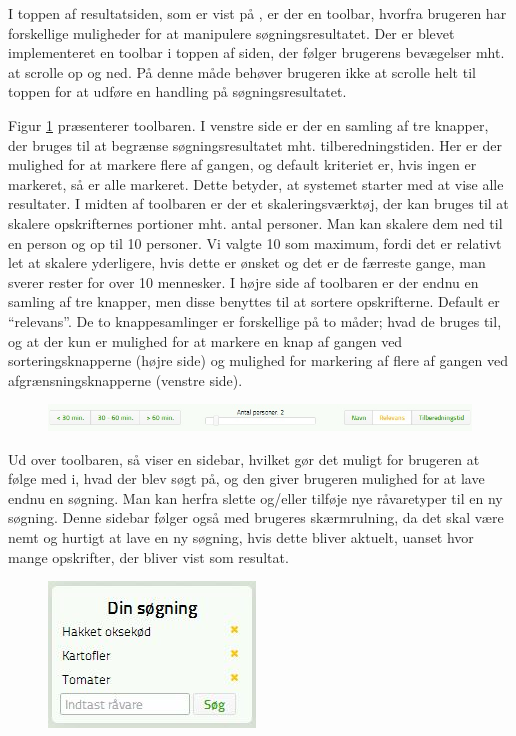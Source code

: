 I toppen af resultatsiden, som er vist på , er der en toolbar, hvorfra brugeren har forskellige muligheder for at manipulere søgningsresultatet. Der er blevet implementeret en toolbar i toppen af siden, der følger brugerens bevægelser mht. at scrolle op og ned. På denne måde behøver brugeren ikke at scrolle helt til toppen for at udføre en handling på søgningsresultatet. 

Figur \ref{fig:foodl-toolbar} præsenterer toolbaren. I venstre side er der en samling af tre knapper, der bruges til at begrænse søgningsresultatet mht. tilberedningstiden. Her er der mulighed for at markere flere af gangen, og default kriteriet er, hvis ingen er markeret, så er alle markeret. Dette betyder, at systemet starter med at vise alle resultater. 
I midten af toolbaren er der et skaleringsværktøj, der kan bruges til at skalere opskrifternes portioner mht. antal personer. Man kan skalere dem ned til en person og op til 10 personer. Vi valgte 10 som maximum, fordi det er relativt let at skalere yderligere, hvis dette er ønsket og det er de færreste gange, man sverer rester for over 10 mennesker.
I højre side af toolbaren er der endnu en samling af tre knapper, men disse benyttes til at sortere opskrifterne. Default er ``relevans''. De to knappesamlinger er forskellige på to måder; hvad de bruges til, og at der kun er mulighed for at markere en knap af gangen ved sorteringsknapperne (højre side) og mulighed for markering af flere af gangen ved afgrænsningsknapperne (venstre side).

\begin{figure}[H]
	\centering
	\includegraphics[scale=0.7]{billeder/foodl/toolbar.jpg}
	\label{fig:foodl-toolbar}
\end{figure}

Ud over toolbaren, så viser  en sidebar, hvilket gør det muligt for brugeren at følge med i, hvad der blev søgt på, og den giver brugeren mulighed for at lave endnu en søgning. Man kan herfra slette og/eller tilføje nye råvaretyper til en ny søgning. Denne sidebar følger også med brugeres skærmrulning, da det skal være nemt og hurtigt at lave en ny søgning, hvis dette bliver aktuelt, uanset hvor mange opskrifter, der bliver vist som resultat.

\begin{figure}[H]
	\centering
	\includegraphics[scale=0.7]{billeder/foodl/sidebar.jpg}
	\label{fig:foodl-sidebar}
\end{figure}

